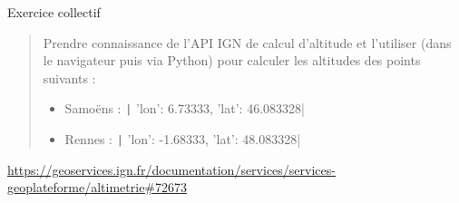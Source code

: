\documentclass[10pt]{beamer}
\begin{document}

\begin{frame}{Exercice collectif}
  \begin{quote}
    Prendre connaissance de l'API IGN de calcul d'altitude et l'utiliser (dans le navigateur puis via Python) pour calculer les altitudes des points suivants :
    \begin{itemize}
      \item Samoëns : \texttt| {'lon': 6.73333, 'lat': 46.083328}|
      \item Rennes : \texttt| {'lon': -1.68333, 'lat': 48.083328}|
    \end{itemize}
  \end{quote}

  {\centering
    \url{https://geoservices.ign.fr/documentation/services/services-geoplateforme/altimetrie\#72673}
  }

\end{frame}
\end{document}
